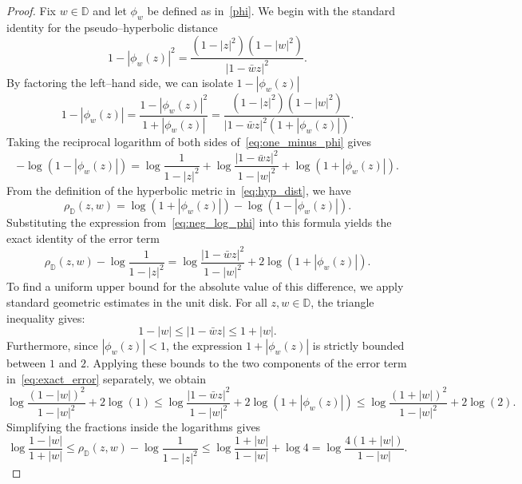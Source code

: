 \documentclass[10pt,a4paper]{amsart}
\numberwithin{equation}{section}
\begin{document}
\begin{proof}
Fix $w\in\mathbb{D}$ and let $\phi_w$ be defined as in~\eqref{phi}.
We begin with the standard identity for the pseudo--hyperbolic distance
\begin{equation}\label{identity-1-phiwz}
1-|\phi_w(z)|^2 = \frac{(1-|z|^2)(1-|w|^2)}{|1-\bar w z|^2}.
\end{equation}
By factoring the left--hand side, we can isolate $1-|\phi_w(z)|$
\begin{equation}\label{eq:one_minus_phi}
1-|\phi_w(z)| = \frac{1-|\phi_w(z)|^2}{1+|\phi_w(z)|} = \frac{(1-|z|^2)(1-|w|^2)}{|1-\bar w z|^2 (1+|\phi_w(z)|)}.
\end{equation}
Taking the reciprocal logarithm of both sides of~\eqref{eq:one_minus_phi} gives
\begin{equation}\label{eq:neg_log_phi}
-\log(1-|\phi_w(z)|) = \log\frac{1}{1-|z|^2} + \log\frac{|1-\bar w z|^2}{1-|w|^2} + \log(1+|\phi_w(z)|).
\end{equation}
From the definition of the hyperbolic metric in~\eqref{eq:hyp_dist}, we have
\begin{equation*}
\rho_{\mathbb{D}}(z,w) =  \log(1+|\phi_w(z)|)-\log(1-|\phi_w(z)|).
\end{equation*}
Substituting the expression from~\eqref{eq:neg_log_phi} into this formula yields the exact identity of the error term
\begin{equation}\label{eq:exact_error}
\rho_{\mathbb{D}}(z,w) - \log\frac{1}{1-|z|^2} = \log\frac{|1-\bar w z|^2}{1-|w|^2} + 2\log(1+|\phi_w(z)|).
\end{equation}
To find a uniform upper bound for the absolute value of this difference, we apply standard geometric estimates in the unit disk. For all $z, w \in \mathbb{D}$, the triangle inequality gives:
\begin{equation*}
1-|w| \le |1-\bar w z| \le 1+|w|.
\end{equation*}
Furthermore, since $|\phi_w(z)| < 1$, the expression $1+|\phi_w(z)|$ is strictly bounded between $1$ and $2$. Applying these bounds to the two components of the error term in~\eqref{eq:exact_error} separately, we obtain
\begin{equation*}
\log\frac{(1-|w|)^2}{1-|w|^2} + 2\log(1) \le \log\frac{|1-\bar w z|^2}{1-|w|^2} + 2\log(1+|\phi_w(z)|) \le \log\frac{(1+|w|)^2}{1-|w|^2} + 2\log(2).
\end{equation*}
Simplifying the fractions inside the logarithms gives
\begin{equation*}
\log\frac{1-|w|}{1+|w|} \le \rho_{\mathbb{D}}(z,w) - \log\frac{1}{1-|z|^2} \le \log\frac{1+|w|}{1-|w|} + \log 4 = \log\frac{4(1+|w|)}{1-|w|}.

\end{equation*}
\end{proof}
\end{document}
